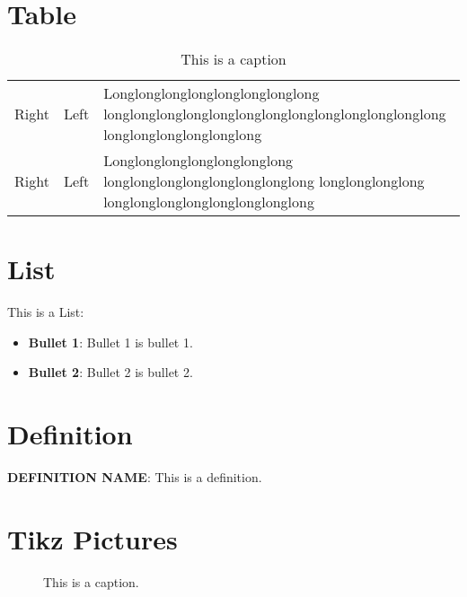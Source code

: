 \section{Table}

\begin{table}[htp]
    \centering
    \begin{tabular}{r|l|p{10cm}}
        Right &  Left  &  Longlonglonglonglonglonglonglong longlonglonglonglonglonglonglonglonglonglonglonglong longlonglonglonglonglong \\
        Right &  Left  &  Longlonglonglonglonglonglong
        longlonglonglonglonglonglonglong
        longlonglonglong
        longlonglonglonglonglonglonglong 
    \end{tabular}
    \caption{This is a caption}
    \label{tab:trans-sym}
\end{table}

\section{List}
This is a List:
\begin{itemize}
    \item \textbf{Bullet 1}: Bullet 1 is bullet 1.
    \item \textbf{Bullet 2}: Bullet 2 is bullet 2.
\end{itemize}

\section{Definition}
\begin{definition}\label{def:def1}
\textbf{DEFINITION NAME}: This is a definition.
\end{definition} 

\section{Tikz Pictures}
\begin{figure}[htp]
    \centering
    \caption{This is a caption. }
    \label{fig:rotation}
\end{figure}

